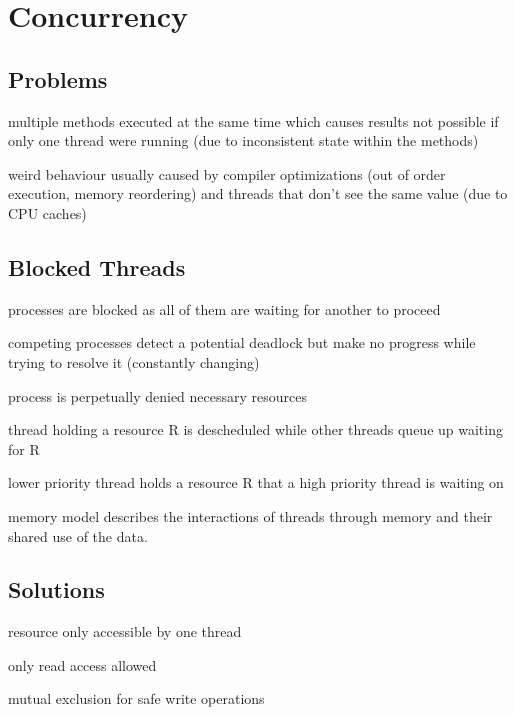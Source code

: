 \documentclass[11pt]{article}
\begin{document}
\section{Concurrency}

\subsection{Problems}

\begin{description}[noitemsep]
	\item[bad interleaving] multiple methods executed at the same time which causes results not possible if only one thread were running (due to inconsistent state within the methods)
	\item[data races] weird behaviour usually caused by compiler optimizations (out of order execution, memory reordering) and threads that don't see the same value (due to CPU caches)
\end{description}

\subsection{Blocked Threads}

\begin{description}[noitemsep]
	\item[deadlock] processes are blocked as all of them are waiting for another to proceed
	\item[livelock] competing processes detect a potential deadlock but make no progress while trying to resolve it (constantly changing)
	\item[starvation] process is perpetually denied necessary resources
	\item[convoying] thread holding a resource R is descheduled while other threads queue up waiting for R
	\item[priority inversion] lower priority thread holds a resource R that a high priority thread is waiting on
\end{description}

memory model describes the interactions of threads through memory and their shared use of the data.

\subsection{Solutions}

\begin{description}[noitemsep]
	\item[thread-local] resource only accessible by one thread
	\item[immutable] only read access allowed
	\item[synchronization] mutual exclusion for safe write operations
\end{description}
\end{document}
